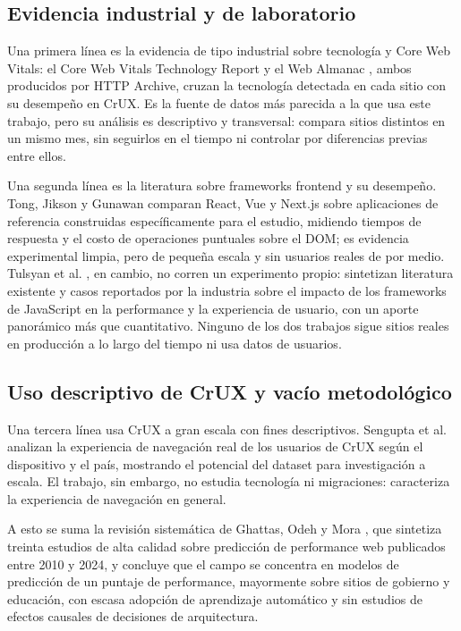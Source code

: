 \documentclass[12pt, a4paper]{article}
\begin{document}
\subsection{Evidencia industrial y de laboratorio}

Una primera línea es la evidencia de tipo industrial sobre tecnología y Core Web Vitals: el Core Web Vitals Technology Report \cite{httparchive2025cwvtech} y el Web Almanac \cite{httparchive2025almanac}, ambos producidos por HTTP Archive, cruzan la tecnología detectada en cada sitio con su desempeño en CrUX. Es la fuente de datos más parecida a la que usa este trabajo, pero su análisis es descriptivo y transversal: compara sitios distintos en un mismo mes, sin seguirlos en el tiempo ni controlar por diferencias previas entre ellos.

Una segunda línea es la literatura sobre frameworks frontend y su desempeño. Tong, Jikson y Gunawan \cite{tong2023comparative} comparan React, Vue y Next.js sobre aplicaciones de referencia construidas específicamente para el estudio, midiendo tiempos de respuesta y el costo de operaciones puntuales sobre el DOM; es evidencia experimental limpia, pero de pequeña escala y sin usuarios reales de por medio. Tulsyan et al. \cite{tulsyan2024impact}, en cambio, no corren un experimento propio: sintetizan literatura existente y casos reportados por la industria sobre el impacto de los frameworks de JavaScript en la performance y la experiencia de usuario, con un aporte panorámico más que cuantitativo. Ninguno de los dos trabajos sigue sitios reales en producción a lo largo del tiempo ni usa datos de usuarios.

\subsection{Uso descriptivo de CrUX y vacío metodológico}

Una tercera línea usa CrUX a gran escala con fines descriptivos. Sengupta et al. \cite{sengupta2023crux} analizan la experiencia de navegación real de los usuarios de CrUX según el dispositivo y el país, mostrando el potencial del dataset para investigación a escala. El trabajo, sin embargo, no estudia tecnología ni migraciones: caracteriza la experiencia de navegación en general.

A esto se suma la revisión sistemática de Ghattas, Odeh y Mora \cite{ghattas2025review}, que sintetiza treinta estudios de alta calidad sobre predicción de performance web publicados entre 2010 y 2024, y concluye que el campo se concentra en modelos de predicción de un puntaje de performance, mayormente sobre sitios de gobierno y educación, con escasa adopción de aprendizaje automático y sin estudios de efectos causales de decisiones de arquitectura.
\end{document}
